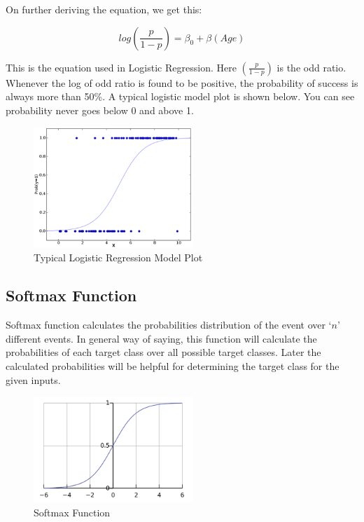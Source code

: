 On further deriving the equation, we get this:

\[
    log(\frac{p}{1 - p}) = \beta_{0} + \beta(Age)
\]

This is the equation used in Logistic Regression. Here $(\frac{p}{1-p})$ is the odd ratio. Whenever the log of odd ratio is found to be positive, the probability of success is always more than 50\%. A typical logistic model plot is shown below. You can see probability never goes below 0 and above 1.

\begin{figure}[H]
    \centering
    \includegraphics[width=6cm]{images/logistic-regression-plot.png}
    \caption{Typical Logistic Regression Model Plot}
\end{figure}

\pagebreak

\subsection{Softmax Function}

Softmax function calculates the probabilities distribution of the event over ‘$n$’ different events. In general way of saying, this function will calculate the probabilities of each target class over all possible target classes. Later the calculated probabilities will be helpful for determining the target class for the given inputs.

\begin{figure}[H]
    \centering
    \includegraphics[width=6cm]{images/softmax-function.png}
    \caption{Softmax Function}
\end{figure}

